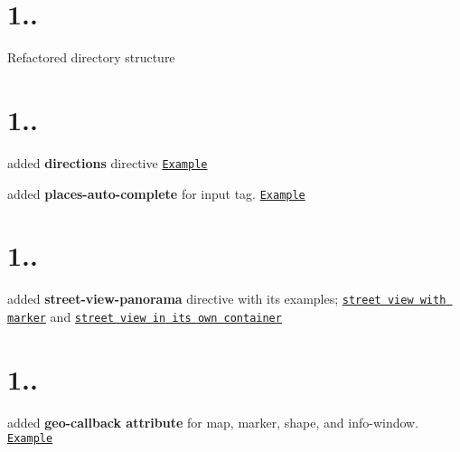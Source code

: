 \section*{1..}


\begin{DoxyItemize}
\item Refactored directory structure
\end{DoxyItemize}

\section*{1..}


\begin{DoxyItemize}
\item added {\bfseries directions} directive \href{https://rawgit.com/allenhwkim/angularjs-google-maps/master/testapp/directions.html}{\tt Example}
\item added {\bfseries places-\/auto-\/complete} for input tag. \href{https://rawgit.com/allenhwkim/angularjs-google-maps/master/testapp/places-auto-complete.html}{\tt Example}
\end{DoxyItemize}

\section*{1..}


\begin{DoxyItemize}
\item added {\bfseries street-\/view-\/panorama} directive with its examples; \href{https://rawgit.com/allenhwkim/angularjs-google-maps/master/testapp/street-view-panorama.html}{\tt street view with marker} and \href{https://rawgit.com/allenhwkim/angularjs-google-maps/master/testapp/street-view-panorama_container.html}{\tt street view in its own container}
\end{DoxyItemize}

\section*{1..}


\begin{DoxyItemize}
\item added {\bfseries geo-\/callback attribute} for map, marker, shape, and info-\/window. \href{https://rawgit.com/allenhwkim/angularjs-google-maps/master/testapp/map_with_current_position.html}{\tt Example}
\end{DoxyItemize}

